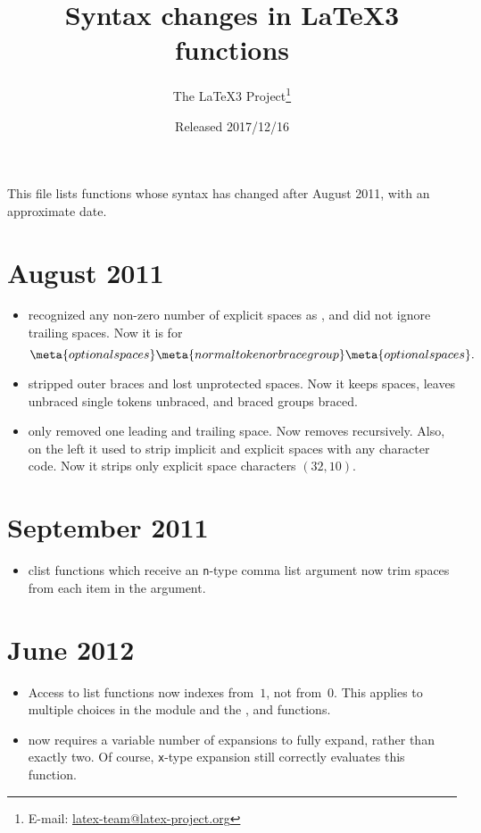 \documentclass{l3doc}
\title{%
  Syntax changes in \LaTeX3 functions%
}
\author{%
  The \LaTeX3 Project\thanks
    {%
      E-mail:
      \href{mailto:latex-team@latex-project.org}%
        {latex-team@latex-project.org}%
    }%
}
\date{Released 2017/12/16}
\newcommand{\TF}{\textit{(TF)}}
\begin{document}
\maketitle

This file lists functions whose syntax has changed after August 2011,
with an approximate date.

\section{August 2011}

\begin{itemize}
  \item \cs{tl_if_single:n\TF} recognized any non-zero number of
    explicit spaces as , and did not ignore trailing spaces.
    Now it is  for
    \[
      \meta{optional spaces}
      \meta{normal token or brace group}
      \meta{optional spaces}.
    \]
  \item {} stripped outer braces and lost unprotected spaces.
    Now it keeps spaces, leaves unbraced single tokens unbraced, and
    braced groups braced.
  \item {} only removed one leading and trailing space.
    Now removes recursively. Also, on the left it used to strip implicit
    and explicit spaces with any character code. Now it strips only explicit
    space characters $(32,10)$.
\end{itemize}

\section{September 2011}

\begin{itemize}
\item clist functions which receive an \texttt{n}-type comma list argument
  now trim spaces from each item in the argument.
\end{itemize}

\section{June 2012}

\begin{itemize}
  \item Access to list functions now indexes from~$1$, not from~$0$.
  This applies to multiple choices in the  module and
  the ,  and 
  functions.
  \item {} now requires a variable number of
  expansions to fully expand, rather than exactly two.  Of course,
  \texttt{x}-type expansion still correctly evaluates this function.
\end{itemize}
\end{document}
